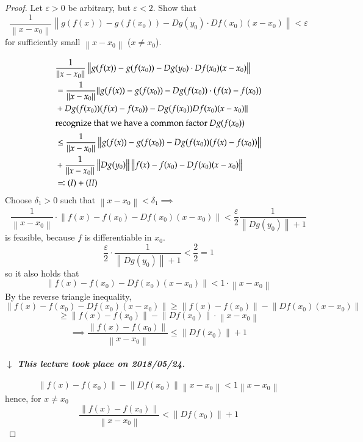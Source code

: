 \documentclass{article}
\newcommand{\norm}[1]{\left\|#1\right\|}
\newcommand{\dateref}[1]{%
  \begin{mdframed}[backgroundcolor=gray!10,innerbottommargin=0pt,innertopmargin=0pt]
    \paragraph{\textit{$\downarrow$ This lecture took place on #1.}}%
  \end{mdframed}%
}
\begin{document}
\begin{proof}
  Let $\varepsilon > 0$ be arbitrary, but $\varepsilon < 2$.
  Show that
  \[ \frac1{\norm{x - x_0}} \norm{g(f(x)) - g(f(x_0)) - Dg(y_0) \cdot Df(x_0) (x - x_0)} < \varepsilon \]
  for sufficiently small $\norm{x - x_0}$ ($x \neq x_0$).

  \begin{align*}
    &\frac1{\norm{x - x_0}} \norm{g(f(x)) - g(f(x_0)) - Dg(y_0) \cdot Df(x_0) (x - x_0)} \\
    &= \frac1{\norm{x - x_0}} \| g(f(x)) - g(f(x_0)) - Dg(f(x_0)) \cdot (f(x) - f(x_0)) \\
    &+ Dg(f(x_0)) (f(x) - f(x_0)) - Dg(f(x_0)) Df(x_0) (x - x_0) \| \\
  \intertext{recognize that we have a common factor $Dg(f(x_0))$}
    &\leq \frac{1}{\norm{x - x_0}} \norm{g(f(x)) - g(f(x_0)) - Dg(f(x_0))(f(x) - f(x_0))} \\
    &+ \frac{1}{\norm{x - x_0}} \norm{Dg(y_0)} \norm{f(x) - f(x_0) - Df(x_0)(x - x_0)} \\
    &\eqqcolon (I) + (II)
  \end{align*}
  Choose $\delta_1 > 0$ such that $\norm{x - x_0} < \delta_1 \implies$
  \[ \frac{1}{\norm{x - x_0}} \cdot \norm{f(x) - f(x_0) - Df(x_0) (x - x_0)} < \frac{\varepsilon}2 \frac{1}{\norm{Dg(y_0)} + 1} \]
  is feasible, because $f$ is differentiable in $x_0$.
  \[ \frac{\varepsilon}{2} \cdot \frac{1}{\norm{Dg(y_0)} + 1} < \frac22 = 1 \]
  so it also holds that
  \[ \norm{f(x) - f(x_0) - Df(x_0) (x - x_0)} < 1 \cdot \norm{x - x_0} \]
  By the reverse triangle inequality,
  \[ \norm{f(x) - f(x_0) - Df(x_0) (x - x_0)} \geq \norm{f(x) - f(x_0)} - \norm{Df(x_0) (x - x_0)} \]
  \[ \geq \norm{f(x) - f(x_0)} - \norm{Df(x_0)} \cdot \norm{x - x_0} \]
  \[ \implies \frac{\norm{f(x) - f(x_0)}}{\norm{x - x_0}} \leq \norm{Df(x_0)} + 1 \]

  \dateref{2018/05/24}

  \[ \norm{f(x) - f(x_0)} - \norm{Df(x_0)} \norm{x - x_0} < 1 \norm{x - x_0} \]
  hence, for $x \neq x_0$
  \[ \frac{\norm{f(x) - f(x_0)}}{\norm{x - x_0}} < \norm{Df(x_0)} + 1 \]


\end{proof}
\end{document}

